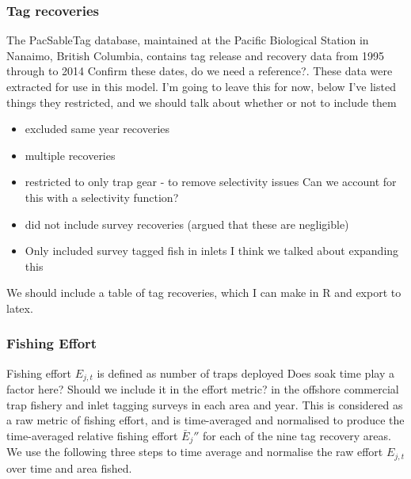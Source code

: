 \documentclass[12pt]{article}
\newcommand{\sj}[1]{{\color{red}\mbox{}\marginpar{\raggedleft\hspace{0pt}*} #1}}
\begin{document}
\subsubsection{Tag recoveries}
The PacSableTag database, maintained at the Pacific Biological Station in Nanaimo, British Columbia, contains tag release and recovery data from 1995 through to 2014 \sj{Confirm these dates, do we need a reference?}. These data were extracted for use in this model. \sj{I'm going to leave this for now, below I've listed things they restricted, and we should talk about whether or not to include them}
  \begin{itemize}
    \item excluded same year recoveries
    \item multiple recoveries
    \item restricted to only trap gear - to remove selectivity issues \sj{Can we account for this with a selectivity function?}
    \item did not include survey recoveries (argued that these are negligible)
    \item Only included survey tagged fish in inlets \sj{I think we talked about expanding this}
  \end{itemize}

We should include a table of tag recoveries, which I can make in R and export to latex.

\subsubsection{Fishing Effort} \label{sec:effort}

Fishing effort $E_{j,t}$ is defined as number of traps deployed \sj{Does soak time play a factor here? Should we include it in the effort metric?} in the offshore commercial trap fishery and inlet tagging surveys in each area and year. This is considered as a raw metric of fishing effort, and is time-averaged and normalised to produce the time-averaged relative fishing effort $\bar{E}_j''$ for each of the nine tag recovery areas. We use the following three steps to time average and normalise the raw effort $E_{j,t}$ over time and area fished.
\end{document}

